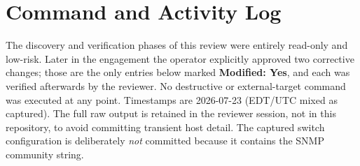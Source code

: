\section{Command and Activity Log}\label{app:command-log}

The discovery and verification phases of this review were entirely read-only and
low-risk. Later in the engagement the operator explicitly approved two corrective
changes; those are the only entries below marked \textbf{Modified: Yes}, and each was
verified afterwards by the reviewer. No destructive or external-target command was
executed at any point. Timestamps are 2026-07-23 (EDT/UTC mixed as captured). The full
raw output is retained in the reviewer session, not in this repository, to avoid
committing transient host detail. The captured switch configuration is deliberately
\emph{not} committed because it contains the SNMP community string.

